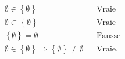 \begin{align*}
 \emptyset \in \left\lbrace \emptyset \right\rbrace & &\text{Vraie}&\\ 
 \emptyset \subset \left\lbrace \emptyset \right\rbrace & &\text{Vraie}&\\
 \left\lbrace \emptyset \right\rbrace = \emptyset & &\text{Fausse}&\\
 \emptyset \in \left\lbrace \emptyset \right\rbrace \Rightarrow \left\lbrace \emptyset \right\rbrace \neq \emptyset & &\text{Vraie}.
\end{align*}
